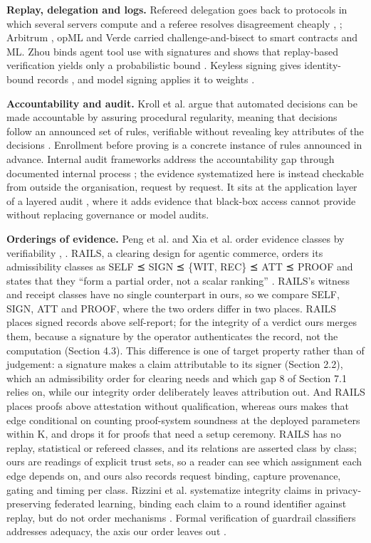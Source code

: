 \documentclass[11pt]{article}
\begin{document}
\textbf{Replay, delegation and logs.} Refereed delegation goes back to protocols in which several servers compute and a referee resolves disagreement cheaply \cite{C6}, \cite{C7}; Arbitrum \cite{C8}, opML \cite{C9} and Verde \cite{C10} carried challenge-and-bisect to smart contracts and ML. Zhou binds agent tool use with signatures and shows that replay-based verification yields only a probabilistic bound \cite{A38}. Keyless signing gives identity-bound records \cite{C20}, and model signing applies it to weights \cite{C22}.

\textbf{Accountability and audit.} Kroll et al. argue that automated decisions can be made accountable by assuring procedural regularity, meaning that decisions follow an announced set of rules, verifiable without revealing key attributes of the decisions \cite{F5}. Enrollment before proving is a concrete instance of rules announced in advance. Internal audit frameworks address the accountability gap through documented internal process \cite{D15}; the evidence systematized here is instead checkable from outside the organisation, request by request. It sits at the application layer of a layered audit \cite{D16}, where it adds evidence that black-box access cannot provide \cite{D18} without replacing governance or model audits.

\textbf{Orderings of evidence.} Peng et al. and Xia et al. order evidence classes by verifiability \cite{A32}, \cite{A35}. RAILS, a clearing design for agentic commerce, orders its admissibility classes as SELF ⪯ SIGN ⪯ \{WIT, REC\} ⪯ ATT ⪯ PROOF and states that they ``form a partial order, not a scalar ranking'' \cite{F9}. RAILS's witness and receipt classes have no single counterpart in ours, so we compare SELF, SIGN, ATT and PROOF, where the two orders differ in two places. RAILS places signed records above self-report; for the integrity of a verdict ours merges them, because a signature by the operator authenticates the record, not the computation (Section 4.3). This difference is one of target property rather than of judgement: a signature makes a claim attributable to its signer (Section 2.2), which an admissibility order for clearing needs and which gap 8 of Section 7.1 relies on, while our integrity order deliberately leaves attribution out. And RAILS places proofs above attestation without qualification, whereas ours makes that edge conditional on counting proof-system soundness at the deployed parameters within K, and drops it for proofs that need a setup ceremony. RAILS has no replay, statistical or refereed classes, and its relations are asserted class by class; ours are readings of explicit trust sets, so a reader can see which assignment each edge depends on, and ours also records request binding, capture provenance, gating and timing per class. Rizzini et al. systematize integrity claims in privacy-preserving federated learning, binding each claim to a round identifier against replay, but do not order mechanisms \cite{F7}. Formal verification of guardrail classifiers addresses adequacy, the axis our order leaves out \cite{E2}.
\end{document}
